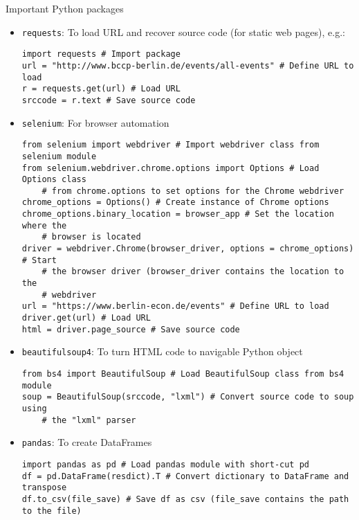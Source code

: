 \begin{frame}{Important Python packages}
\begin{itemize}
	\item \texttt{requests}: To load URL and recover source code (for static web pages), e.g.:
\begin{verbatim}
import requests # Import package
url = "http://www.bccp-berlin.de/events/all-events" # Define URL to load
r = requests.get(url) # Load URL
srccode = r.text # Save source code
\end{verbatim}

\framebreak

	\item \texttt{selenium}: For browser automation
\begin{verbatim}
from selenium import webdriver # Import webdriver class from selenium module
from selenium.webdriver.chrome.options import Options # Load Options class
    # from chrome.options to set options for the Chrome webdriver
chrome_options = Options() # Create instance of Chrome options
chrome_options.binary_location = browser_app # Set the location where the
    # browser is located
driver = webdriver.Chrome(browser_driver, options = chrome_options) # Start
    # the browser driver (browser_driver contains the location to the
    # webdriver
url = "https://www.berlin-econ.de/events" # Define URL to load
driver.get(url) # Load URL
html = driver.page_source # Save source code
\end{verbatim}

\framebreak

	\item \texttt{beautifulsoup4}: To turn HTML code to navigable Python object
\begin{verbatim}
from bs4 import BeautifulSoup # Load BeautifulSoup class from bs4 module
soup = BeautifulSoup(srccode, "lxml") # Convert source code to soup using
    # the "lxml" parser
\end{verbatim}

	\item \texttt{pandas}: To create DataFrames
\begin{verbatim}
import pandas as pd # Load pandas module with short-cut pd
df = pd.DataFrame(resdict).T # Convert dictionary to DataFrame and transpose
df.to_csv(file_save) # Save df as csv (file_save contains the path to the file)
\end{verbatim}
\end{itemize}

\end{frame}